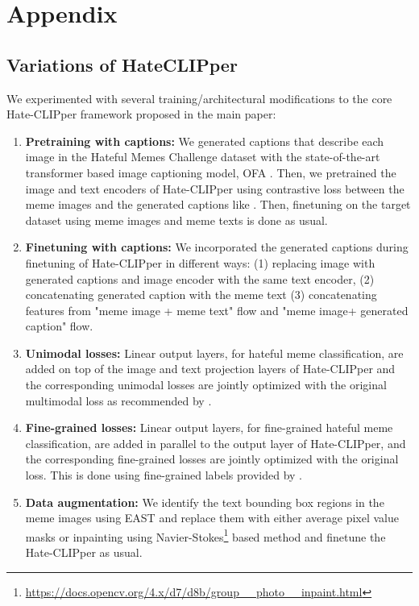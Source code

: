 \documentclass[11pt]{article}
\begin{document}



\clearpage

\appendix
\section{Appendix}


\subsection{Variations of HateCLIPper}

We experimented with several training/architectural modifications to the core Hate-CLIPper framework proposed in the main paper:

\begin{enumerate}
    \item \textbf{Pretraining with captions:} We generated captions that describe each image in the Hateful Memes Challenge dataset with the state-of-the-art transformer based image captioning model, OFA \cite{Wang2022UnifyingAT}. Then, we pretrained the image and text encoders of Hate-CLIPper using contrastive loss between the meme images and the generated captions like \citet{radford2021learning}. Then, finetuning on the target dataset using meme images and meme texts is done as usual.
    
    \item \textbf{Finetuning with captions:} We incorporated the generated captions during finetuning of Hate-CLIPper in different ways: (1) replacing image with generated captions and image encoder with the same text encoder, (2) concatenating generated caption with the meme text (3) concatenating features from "meme image + meme text" flow and "meme image+ generated caption" flow.
    
    \item \textbf{Unimodal losses:} Linear output layers, for hateful meme classification, are added on top of the image and text projection layers of Hate-CLIPper and the corresponding unimodal losses are jointly optimized with the original multimodal
     loss as recommended by \citet{Ma2022AreMT}.
    
    \item \textbf{Fine-grained losses:} Linear output layers, for fine-grained hateful meme classification, are added in parallel to the output layer of Hate-CLIPper, and the corresponding fine-grained losses are jointly optimized with the original loss. This is done using fine-grained labels provided by \citet{mathias-etal-2021-findings}.
    
    \item \textbf{Data augmentation:} We identify the text bounding box regions in the meme images using EAST \cite{Zhou2017EASTAE} and replace them with either average pixel value masks or inpainting using Navier-Stokes\footnote{\url{https://docs.opencv.org/4.x/d7/d8b/group__photo__inpaint.html}} based method and finetune the Hate-CLIPper as usual.
\end{enumerate}
\end{document}
